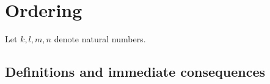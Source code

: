 \documentclass[../../arithmetic.ftl.tex]{subfiles}
\begin{document}
  \section{Ordering}

  \begin{forthel}
  \end{forthel}

  \begin{forthel}
    Let $k, l, m, n$ denote natural numbers.
  \end{forthel}


  \subsection{Definitions and immediate consequences}
\end{document}
